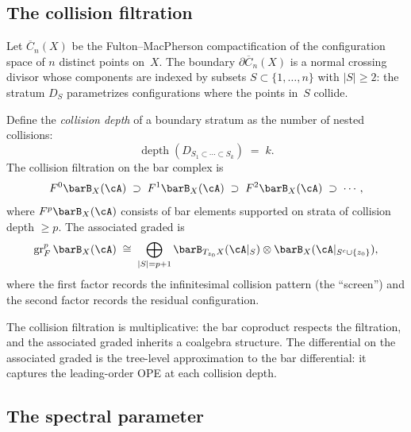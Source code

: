 \subsection{The collision filtration}
\label{subsec:thqg-intro-collision-definition}

Let $\overline{C}_n(X)$ be the Fulton--MacPherson compactification of
the configuration space of $n$ distinct points on~$X$. The boundary
$\partial \overline{C}_n(X)$ is a normal crossing divisor whose
components are indexed by subsets $S \subset \{1, \ldots, n\}$ with
$|S| \ge 2$: the stratum $D_S$ parametrizes configurations where the
points in~$S$ collide.

Define the \emph{collision depth} of a boundary stratum as the number
of nested collisions:
\begin{equation}\label{eq:thqg-intro-collision-depth}
\operatorname{depth}(D_{S_1 \subset \cdots \subset S_k})
\;=\; k.
\end{equation}
The collision filtration on the bar complex is
\begin{equation}\label{eq:thqg-intro-collision-filtration}
F^0 \barB_X(\cA)
\;\supset\;
F^1 \barB_X(\cA)
\;\supset\;
F^2 \barB_X(\cA)
\;\supset\; \cdots,
\end{equation}
where $F^p \barB_X(\cA)$ consists of bar elements supported on strata
of collision depth $\ge p$. The associated graded is
\[
\operatorname{gr}^p_F \barB_X(\cA)
\;\cong\;
\bigoplus_{|S| = p+1}
\barB_{T_{z_0}X}(\cA|_S) \otimes \barB_X(\cA|_{S^c \cup \{z_0\}}),
\]
where the first factor records the infinitesimal collision pattern
(the ``screen'') and the second factor records the residual
configuration.

The collision filtration is multiplicative: the bar coproduct respects
the filtration, and the associated graded inherits a coalgebra structure.
The differential on the associated graded is the tree-level
approximation to the bar differential: it captures the leading-order
OPE at each collision depth.

\subsection{The spectral parameter}
\label{subsec:thqg-intro-spectral-parameter}

